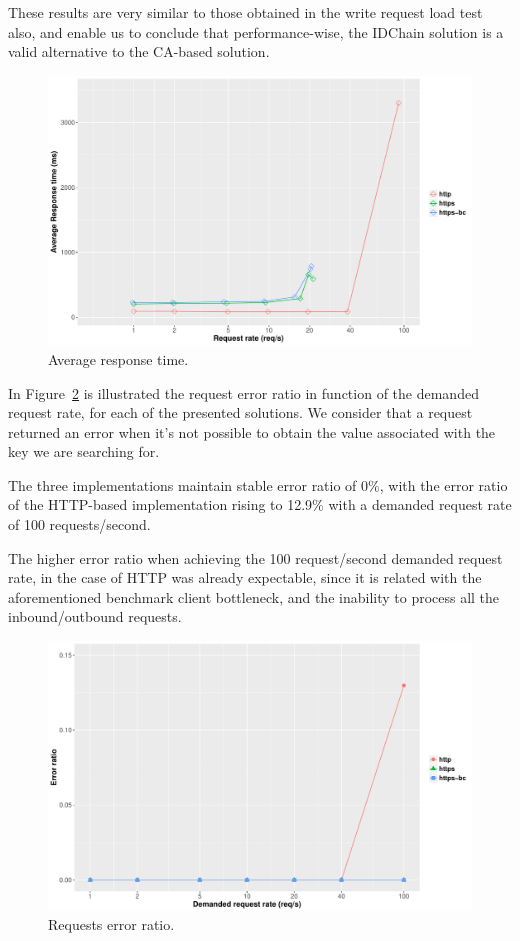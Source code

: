 These results are very similar to those obtained in the write request load test also, and enable us to conclude that performance-wise, the IDChain solution is a valid alternative to the CA-based solution.

\begin{figure}[htb]
  \centering
  \includegraphics[scale=0.4]{Figures/evaluation/average-response-time-reads-new.pdf}
  \caption{Average response time.}
  \label{fig:average-response-time-reads}
\end{figure}

In Figure~\ref{fig:error-ratio-reads} is illustrated the request error ratio in function of the demanded request rate, for each of the presented solutions.
We consider that a request returned an error when it's not possible to obtain the value associated with the key we are searching for.

The three implementations maintain stable error ratio of 0\%, with the error ratio of the HTTP-based implementation rising to 12.9\% with a demanded request rate of 100 requests/second.

The higher error ratio when achieving the 100 request/second demanded request rate, in the case of HTTP was already expectable, since it is related with the aforementioned benchmark client bottleneck, and the inability to process all the inbound/outbound requests.

\begin{figure}[htb]
  \centering
  \includegraphics[scale=0.4]{Figures/evaluation/error-ratio-reads-new.pdf}
  \caption{Requests error ratio.}
  \label{fig:error-ratio-reads}
\end{figure}

